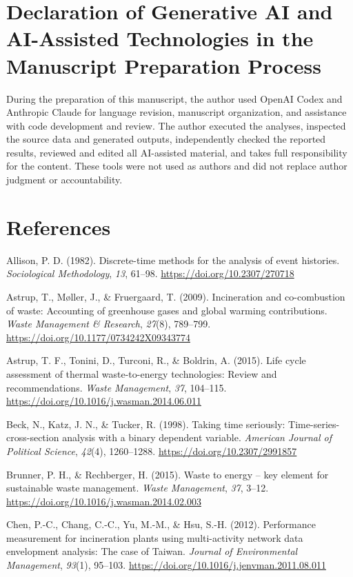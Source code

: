 \documentclass[11pt,letterpaper]{article}
\begin{document}
\section*{Declaration of Generative AI and AI-Assisted Technologies in the
Manuscript Preparation Process}

During the preparation of this manuscript, the author used OpenAI Codex and
Anthropic Claude for language revision, manuscript organization, and assistance
with code development and review. The author executed the analyses, inspected
the source data and generated outputs, independently checked the reported
results, reviewed and edited all AI-assisted material, and takes full
responsibility for the content. These tools were not used as authors and did not
replace author judgment or accountability.

\section*{References}
\begingroup
\small
\setlength{\parindent}{0pt}
\setlength{\parskip}{0.55em}

Allison, P. D. (1982). Discrete-time methods for the analysis of event
histories. \textit{Sociological Methodology}, \textit{13}, 61--98.
\url{https://doi.org/10.2307/270718}

Astrup, T., M\o ller, J., \& Fruergaard, T. (2009). Incineration and
co-combustion of waste: Accounting of greenhouse gases and global warming
contributions. \textit{Waste Management \& Research}, \textit{27}(8), 789--799.
\url{https://doi.org/10.1177/0734242X09343774}

Astrup, T. F., Tonini, D., Turconi, R., \& Boldrin, A. (2015). Life cycle
assessment of thermal waste-to-energy technologies: Review and recommendations.
\textit{Waste Management}, \textit{37}, 104--115.
\url{https://doi.org/10.1016/j.wasman.2014.06.011}

Beck, N., Katz, J. N., \& Tucker, R. (1998). Taking time seriously:
Time-series-cross-section analysis with a binary dependent variable.
\textit{American Journal of Political Science}, \textit{42}(4), 1260--1288.
\url{https://doi.org/10.2307/2991857}

Brunner, P. H., \& Rechberger, H. (2015). Waste to energy -- key element for
sustainable waste management. \textit{Waste Management}, \textit{37}, 3--12.
\url{https://doi.org/10.1016/j.wasman.2014.02.003}

Chen, P.-C., Chang, C.-C., Yu, M.-M., \& Hsu, S.-H. (2012). Performance
measurement for incineration plants using multi-activity network data
envelopment analysis: The case of Taiwan. \textit{Journal of Environmental
Management}, \textit{93}(1), 95--103.
\url{https://doi.org/10.1016/j.jenvman.2011.08.011}
\end{document}

